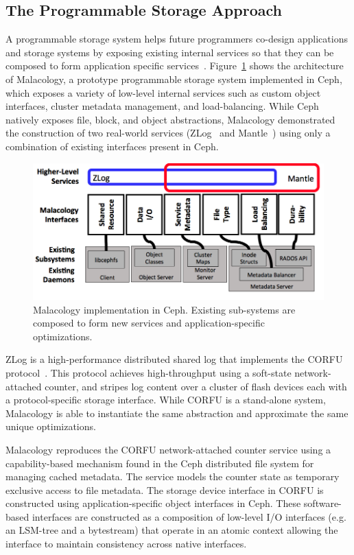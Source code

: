 \subsection{The Programmable Storage Approach}

A programmable storage system helps future programmers co-design applications
and storage systems by exposing existing internal services so that 
they can be composed to form application specific
services~\cite{sevilla:eurosys17}.
Figure~\ref{fig:malacology} shows the architecture of Malacology, a prototype programmable storage system
implemented in Ceph, which exposes a variety of low-level internal services
such as custom object interfaces, cluster metadata management, and
load-balancing. While Ceph natively exposes file, block, and object
abstractions, Malacology demonstrated the construction of two real-world
services (ZLog~\cite{watkins:ucsc-soe-16-12} and Mantle~\cite{sevilla:sc15-mantle}) using only a combination of existing interfaces present in Ceph.

\begin{figure}[t]
\centering
\includegraphics[width=1.0\linewidth]{implementation-overview.png}
\caption{Malacology implementation in Ceph. Existing sub-systems are composed
    to form new services and application-specific optimizations.}
\label{fig:malacology}
\end{figure}

ZLog is a high-performance distributed shared
log that implements the CORFU protocol~\cite{balakrishnan:nsdi12}.
This protocol achieves high-throughput using a soft-state network-attached
counter, and stripes log content over a cluster of flash devices each with a
protocol-specific storage interface. While CORFU is a stand-alone system,
Malacology is able to instantiate the same abstraction and approximate 
the same unique optimizations.

Malacology reproduces the CORFU network-attached counter service using a
capability-based mechanism found in the Ceph distributed file system for
managing cached metadata. The service models the counter state as temporary
exclusive access to file metadata.  The storage device interface in CORFU is
constructed using application-specific object interfaces in Ceph. These
software-based interfaces are constructed as a composition of low-level I/O
interfaces (e.g. an LSM-tree and a bytestream) that operate in an atomic
context allowing the interface to maintain consistency across native
interfaces.


